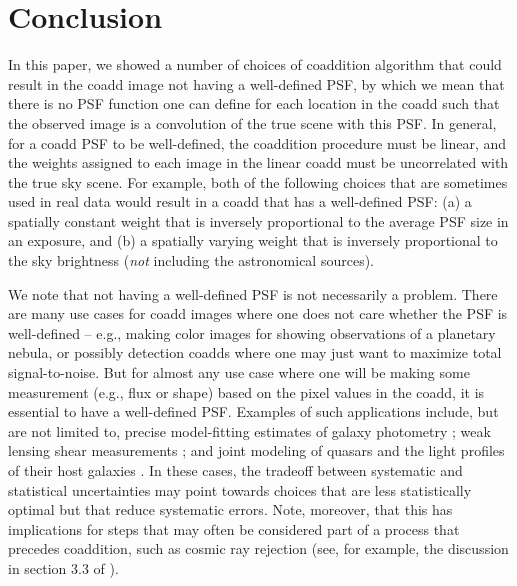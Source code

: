 \documentclass{openjournal}
\newcommand{\rachel}[1]{{\color{magenta}RM: #1}}
\newcommand{\mike}[1]{{\color{cyan}MJ: #1}}
\newcommand{\refresponse}[1]{#1}
\begin{document}
\section{Conclusion}

In this paper, we showed a number of choices of coaddition algorithm that could result
in the coadd image not having a well-defined PSF, by which we mean that there is no
PSF function one can define for each location in the coadd such that the observed image is a convolution
of the true scene with this PSF. In general, for a coadd PSF to be well-defined, the coaddition procedure must be linear, and the weights assigned to each image in the linear coadd must be uncorrelated with the true sky scene.  For example, both of the following choices that are sometimes used in real data would result in a coadd that has a well-defined PSF: (a) a spatially constant weight that is inversely proportional to the average PSF size in an exposure, and (b) a spatially varying weight that is inversely proportional to the sky brightness ({\em not} including the astronomical sources).  

We note that not having a well-defined PSF is not necessarily a problem.  There are many use cases for coadd images
where one does not care whether the PSF is well-defined -- e.g., making color images
for showing observations of a planetary nebula, or possibly detection coadds where one may just want to maximize total signal-to-noise.
But for almost any use case where one will
be making some measurement (e.g., flux or shape) based on the pixel values in the coadd,
it is essential to have a well-defined PSF.  \refresponse{Examples of such applications include, but are not limited to, precise model-fitting estimates of galaxy photometry \citep[e.g.,][]{2018PASJ...70S...5B}; weak lensing shear measurements \citep[e.g.,][]{2008A&A...484...67P}; and joint modeling of quasars and the light profiles of their host galaxies \citep[see, e.g.,][]{2021ApJ...918...22L}.} In these cases, the tradeoff between systematic and statistical uncertainties may point towards choices that are less statistically optimal but that reduce systematic errors.  Note, moreover, that this has implications for steps that may often be considered part of a process that precedes coaddition, such as cosmic ray rejection (see, for example, the discussion in section 3.3 of \citealt{2018PASJ...70S...5B}).
\end{document}
